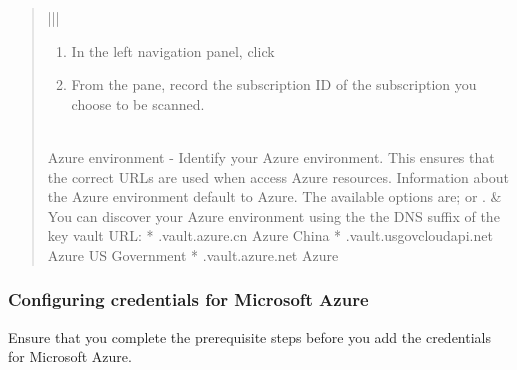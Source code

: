 \documentclass[letterpaper,10pt,english]{sphinxmanual}
\begin{document}
\begin{quote}
\begin{savenotes}
\begin{tabular}[t]{|*{2}{|}}
\begin{enumerate}
\item {} 
In the left navigation panel, click 

\item {} 
From the  pane, record the
subscription ID of the subscription you choose to be
scanned.

\end{enumerate}
\\
\hline
Azure environment - Identify your
Azure environment. This ensures that
the correct URLs are used when access
Azure resources.
Information about the Azure environment
default to Azure. The available options
are;  or .
&
You can discover your Azure environment using the
the DNS suffix of the key vault URL:
*  .vault.azure.cn \textendash{} Azure China
*  .vault.usgovcloudapi.net \textendash{} Azure US Government
*  .vault.azure.net \textendash{} Azure
\\
\hline
\end{tabular}
\par
\sphinxattableend\end{savenotes}
\end{quote}


\subsubsection{Configuring credentials for Microsoft Azure}
\label{\detokenize{mcdmp_app_ug:configuring-credentials-for-microsoft-azure}}
Ensure that you complete the prerequisite steps before you add the credentials for Microsoft Azure.

{\hyperref[\detokenize{mcdmp_app_ug:prerequisites-azure}]{}}
\end{document}
